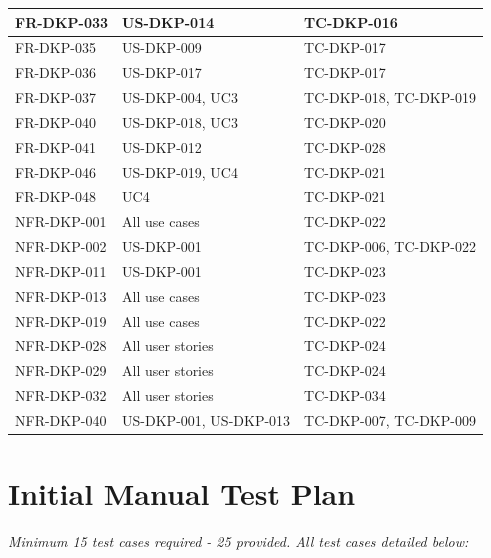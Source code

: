 \documentclass[12pt,a4paper]{report}
\begin{document}
\begin{longtable}{|p{3cm}|p{4cm}|p{3cm}|}
FR-DKP-033 & US-DKP-014 & TC-DKP-016 \\ \hline
FR-DKP-035 & US-DKP-009 & TC-DKP-017 \\ \hline
FR-DKP-036 & US-DKP-017 & TC-DKP-017 \\ \hline
FR-DKP-037 & US-DKP-004, UC3 & TC-DKP-018, TC-DKP-019 \\ \hline
FR-DKP-040 & US-DKP-018, UC3 & TC-DKP-020 \\ \hline
FR-DKP-041 & US-DKP-012 & TC-DKP-028 \\ \hline
FR-DKP-046 & US-DKP-019, UC4 & TC-DKP-021 \\ \hline
FR-DKP-048 & UC4 & TC-DKP-021 \\ \hline
NFR-DKP-001 & All use cases & TC-DKP-022 \\ \hline
NFR-DKP-002 & US-DKP-001 & TC-DKP-006, TC-DKP-022 \\ \hline
NFR-DKP-011 & US-DKP-001 & TC-DKP-023 \\ \hline
NFR-DKP-013 & All use cases & TC-DKP-023 \\ \hline
NFR-DKP-019 & All use cases & TC-DKP-022 \\ \hline
NFR-DKP-028 & All user stories & TC-DKP-024 \\ \hline
NFR-DKP-029 & All user stories & TC-DKP-024 \\ \hline
NFR-DKP-032 & All user stories & TC-DKP-034 \\ \hline
NFR-DKP-040 & US-DKP-001, US-DKP-013 & TC-DKP-007, TC-DKP-009 \\ \hline
\end{longtable}

\section{Initial Manual Test Plan}

\textit{Minimum 15 test cases required - 25 provided. All test cases detailed below:}
\end{document}
